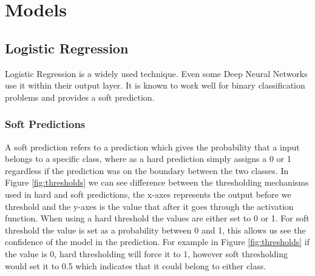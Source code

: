 \section{Models}
\subsection{Logistic Regression}
Logistic Regression is a widely used technique. Even some Deep Neural Networks use it within their output layer. It is known to work well for binary classification problems and provides a soft prediction. 
\subsubsection{Soft Predictions}
A soft prediction refers to a prediction which gives the probability that a input belongs to a specific class, where as a hard prediction simply assigns a 0 or 1 regardless if the prediction was on the boundary between the two classes. In Figure \ref{fig:thresholds} we can see difference between the thresholding mechanisms used in hard and soft predictions, the x-axes represents the output before  we threshold and the y-axes is the value that after it goes through the activation function. When using a hard threshold the values are either set to 0 or 1. For soft threshold the value is set as a probability between 0 and 1, this allows us see the confidence of the model in the prediction. For example in Figure \ref{fig:thresholds} if the value is 0, hard thresholding will force it to 1, however soft thresholding would set it to 0.5 which indicates that it could belong to either class. 

